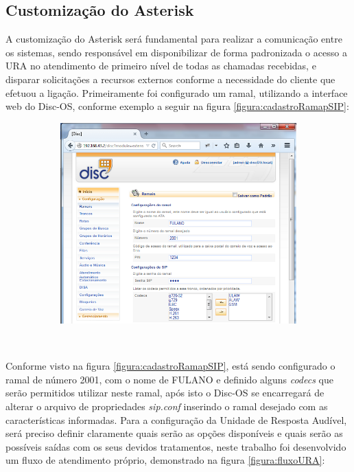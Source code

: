 \subsection{\textbf{Customização do Asterisk}}

A customização do Asterisk será fundamental para realizar a comunicação entre os sistemas, sendo responsável em disponibilizar de forma padronizada o acesso a URA no atendimento de primeiro nível de todas as chamadas recebidas, e disparar solicitações a recursos externos conforme a necessidade do cliente que efetuou a ligação.
Primeiramente foi configurado um ramal, utilizando a interface web do Disc-OS, conforme exemplo a seguir na figura \ref{figura:cadastroRamapSIP}:


\begin{figure}[H]
	\caption{\textbf{Cadastro de um Ramal SIP.}}	
	\label{figura:cadastroRamapSIP}
		\begin{subfigure}[H]{\textwidth}
			\centering
			\includegraphics{figuras/cadastro_ramal_sip.png}
		\end{subfigure}
	\\[6pt]
	\fontsize{10}{12}\selectfont {Fonte: Autoria Própria.}
\end{figure}


Conforme visto na figura \ref{figura:cadastroRamapSIP}, está sendo configurado o ramal de número 2001, com o nome de FULANO e definido alguns \textit{codecs} que serão permitidos utilizar neste ramal, após isto o Disc-OS se encarregará de alterar o arquivo de propriedades \textit{sip.conf} inserindo o ramal desejado com as características informadas.
Para a configuração da Unidade de Resposta Audível, será preciso definir claramente quais serão as opções disponíveis e quais serão as possíveis saídas com os seus devidos tratamentos, neste trabalho foi desenvolvido um fluxo de atendimento próprio, demonstrado na figura \ref{figura:fluxoURA}: 

